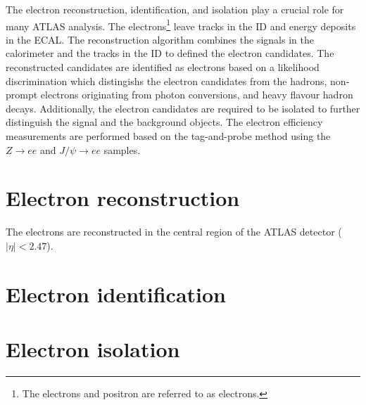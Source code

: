 The electron reconstruction, identification, and isolation play a crucial role for many ATLAS analysis.
The electrons\footnote{The electrons and positron are referred to as electrons.} leave tracks in the ID and energy deposits in the ECAL.
The reconstruction algorithm combines the signals in the calorimeter and the tracks in the ID to defined the electron candidates.
The reconstructed candidates are identified as electrons based on a likelihood discrimination which distingishs the electron candidates from the hadrons, non-prompt electrons originating from photon conversions, and heavy flavour hadron decays.
Additionally, the electron candidates are required to be isolated to further distinguish the signal and the background objects.
The electron efficiency measurements are performed based on the tag-and-probe method using the $Z \to ee$ and $J/\psi \to ee$ samples.


\section{Electron reconstruction}
\label{sec:app_electron_reconstruction}
The electrons are reconstructed in the central region of the ATLAS detector ($|\eta| < 2.47$).

\section{Electron identification}
\label{sec:app_electron_identification}


\section{Electron isolation}
\label{sec:app_electron_isolation}
